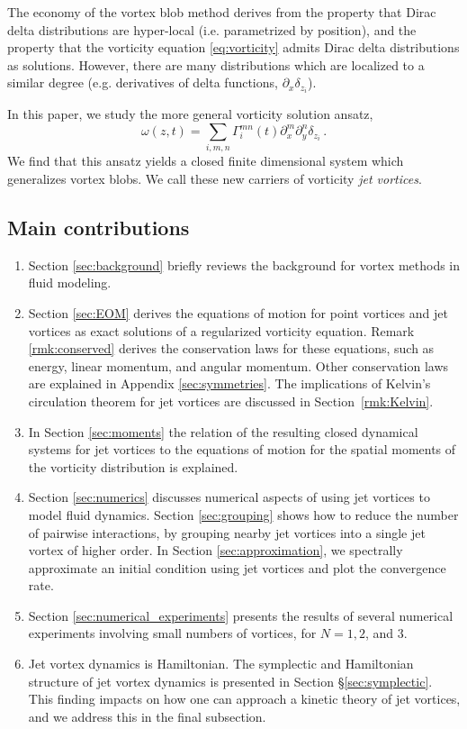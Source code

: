 \documentclass[12pt]{amsart}
\theoremstyle{remark}
\begin{document}
The economy of the vortex blob method derives from the property that Dirac delta distributions are hyper-local (i.e. parametrized by position), and the property that the vorticity equation  \eqref{eq:vorticity} admits Dirac delta distributions as solutions.
However, there are many distributions which are localized to a similar degree (e.g. derivatives of delta functions, $\partial_x \delta_{z_i}$).

In this paper, we study the more general vorticity solution ansatz,
\[\omega(z,t) = \sum_{i,m,n} \Gamma_i^{mn}(t) \partial_x^m \partial_y^n \delta_{z_i}\,.\]
We find that this ansatz yields a closed finite dimensional system which generalizes vortex blobs. We call these new carriers of vorticity \emph{jet vortices}.

\subsection{Main contributions}
\begin{enumerate}
        \item Section \ref{sec:background} briefly reviews the background for vortex methods in fluid modeling.
        \item Section \ref{sec:EOM} derives the equations of motion for point vortices and jet vortices as exact solutions of a regularized vorticity equation. Remark \ref{rmk:conserved} derives the conservation laws for these equations, such as energy, linear momentum, and angular momentum. Other conservation laws are explained in Appendix \ref{sec:symmetries}. The implications of Kelvin's circulation theorem for jet vortices are discussed in Section~\ref{rmk:Kelvin}.
        \item In Section \ref{sec:moments} the relation of the resulting closed dynamical systems for jet vortices to the equations of motion for the spatial moments of the vorticity distribution is explained.
        \item Section \ref{sec:numerics} discusses numerical aspects of using jet vortices to model fluid dynamics. Section \ref{sec:grouping} shows how to reduce the number of pairwise interactions, by grouping nearby jet vortices into a single jet vortex of higher order. In Section \ref{sec:approximation}, we spectrally approximate an initial condition using jet vortices and plot the convergence rate. 
        \item   Section \ref{sec:numerical_experiments} presents the results of several numerical experiments involving small numbers of vortices, for $N=1,2$, and $3$.
        	\item Jet vortex dynamics is Hamiltonian. The symplectic and Hamiltonian structure of jet vortex dynamics is presented in Section \S \ref{sec:symplectic}.
	This finding impacts on how one can approach a kinetic theory of jet vortices, and we address this in the final subsection.
\end{enumerate}
\end{document}
